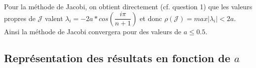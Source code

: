 Pour la méthode de Jacobi, on obtient directement (cf. question 1) que les valeurs propres de $\mathcal{J}$ valent
$\lambda _i = -2a * cos(\dfrac{i \pi}{n+1})$ et donc $\rho(\mathcal{J}) = max |\lambda _i| < 2a$.
Ainsi la méthode de Jacobi convergera pour des valeurs de $a \leq 0.5$.

\subsection{Représentation des résultats en fonction de $a$}
